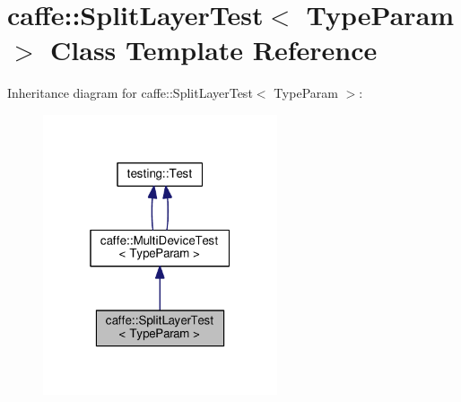 \hypertarget{classcaffe_1_1_split_layer_test}{}\section{caffe\+:\+:Split\+Layer\+Test$<$ Type\+Param $>$ Class Template Reference}
\label{classcaffe_1_1_split_layer_test}


Inheritance diagram for caffe\+:\+:Split\+Layer\+Test$<$ Type\+Param $>$\+:
\nopagebreak
\begin{figure}[H]
\begin{center}
\leavevmode
\includegraphics[width=196pt]{classcaffe_1_1_split_layer_test__inherit__graph}
\end{center}
\end{figure}
